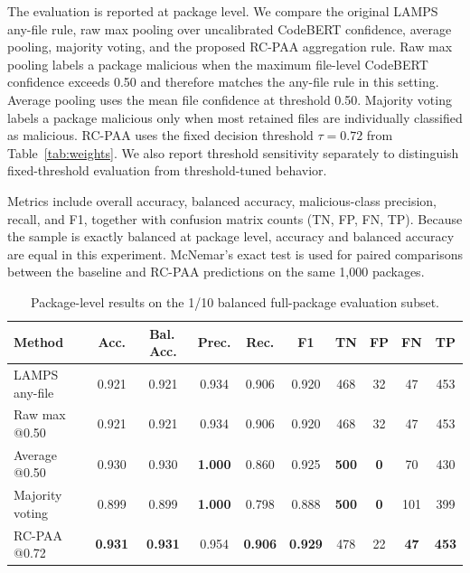 \documentclass[conference,a4paper]{IEEEtran}
\newcommand{\rcpaa}{RC-PAA}
\newcommand{\codebert}{CodeBERT}
\begin{document}
The evaluation is reported at package level. We compare the original LAMPS any-file
rule, raw max pooling over uncalibrated \codebert{} confidence, average pooling,
majority voting, and the proposed \rcpaa{} aggregation rule. Raw max pooling labels a
package malicious when the maximum file-level \codebert{} confidence exceeds 0.50 and
therefore matches the any-file rule in this setting. Average pooling uses the mean
file confidence at threshold 0.50. Majority voting labels a package malicious only
when most retained files are individually classified as malicious. \rcpaa{} uses the
fixed decision threshold $\tau=0.72$ from Table~\ref{tab:weights}. We also report
threshold sensitivity separately to distinguish fixed-threshold evaluation from
threshold-tuned behavior.

Metrics include overall accuracy, balanced accuracy, malicious-class precision,
recall, and F1, together with confusion matrix counts (TN, FP, FN, TP). Because the
sample is exactly balanced at package level, accuracy and balanced accuracy are equal
in this experiment. McNemar's exact test is used for paired comparisons between the
baseline and \rcpaa{} predictions on the same 1,000 packages.

\begin{table}[t]
\centering
\caption{Package-level results on the 1/10 balanced full-package evaluation subset.}
\label{tab:main-results}
\tiny
\setlength{\tabcolsep}{2pt}
\begin{tabular}{lccccccccc}
\toprule
Method & Acc. & Bal.\,Acc. & Prec. & Rec. & F1 & TN & FP & FN & TP \\
\midrule
LAMPS any-file       & 0.921 & 0.921 & 0.934 & 0.906 & 0.920 & 468 & 32 & 47 & 453 \\
Raw max @0.50        & 0.921 & 0.921 & 0.934 & 0.906 & 0.920 & 468 & 32 & 47 & 453 \\
Average @0.50        & 0.930 & 0.930 & \textbf{1.000} & 0.860 & 0.925 & \textbf{500} & \textbf{0} & 70 & 430 \\
Majority voting      & 0.899 & 0.899 & \textbf{1.000} & 0.798 & 0.888 & \textbf{500} & \textbf{0} & 101 & 399 \\
\rcpaa{} @0.72       & \textbf{0.931} & \textbf{0.931} & 0.954 & \textbf{0.906} & \textbf{0.929} & 478 & 22 & \textbf{47} & \textbf{453} \\
\bottomrule
\end{tabular}
\end{table}
\end{document}
